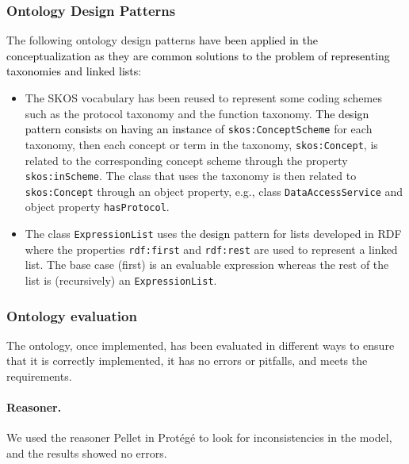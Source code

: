 \subsubsection{Ontology Design Patterns}
The following ontology design patterns \textcolor{black}{have been applied in the conceptualization as they are common solutions to the problem of representing taxonomies and linked lists}:
\begin{itemize}
    \item The SKOS vocabulary has been reused to represent some coding schemes such as the protocol taxonomy and the function taxonomy. \textcolor{black}{The design pattern consists on having an instance of} \texttt{skos:ConceptScheme} for each taxonomy, then each concept or term in the taxonomy, \texttt{skos:Concept}, is related to the corresponding concept scheme through the property \texttt{skos:inScheme}. The class that uses the taxonomy is then related to \texttt{skos:Concept} through an object property, e.g., class \texttt{DataAccessSer\-vice} and object property \texttt{hasProtocol}.
    \item The class \texttt{ExpressionList} uses the \textcolor{black}{design} pattern for lists developed in RDF where the properties \texttt{rdf:first} and \texttt{rdf:rest} are used to represent a linked list. The base case (first) is an evaluable expression whereas the rest of the list is (recursively)  an \texttt{ExpressionList}.
\end{itemize}

\subsubsection{Ontology evaluation}\label{sec:eval}


The ontology, once implemented, has been evaluated in different ways to ensure that it is correctly implemented, it has no errors or pitfalls, and meets the requirements.

\noindent\paragraph{\textbf{Reasoner.}} We used the reasoner Pellet in Protégé to look for inconsistencies in the model, and the results showed no errors.

